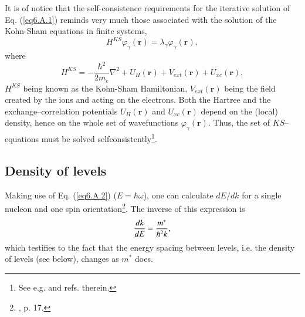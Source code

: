 It is of notice that the self-consistence requirements for the iterative solution of Eq. (\ref{eq6.A.1}) reminds very much those associated with the solution of the Kohn-Sham equations in finite systems,
 \begin{equation}
 H^{KS}\varphi_\gamma(\mathbf{r})=\lambda_\gamma\varphi_\gamma(\mathbf{r}),
 \end{equation}
where
 \begin{equation}
 H^{KS}=-\frac{\hbar^2}{2 m_e}\nabla^2+U_H(\mathbf{r})+V_{ext}(\mathbf{r})+U_{xc}(\mathbf{r}),
 \end{equation}
$H^{KS}$ being known as the Kohn-Sham Hamiltonian, $V_{ext}(\mathbf{r})$ being the field created by the ions and acting on the electrons. Both the Hartree and the exchange--correlation potentials $U_H(\mathbf{r})$ and $U_{xc}(\mathbf{r})$ depend on the (local) density, hence on the whole set of wavefunctions $\varphi_\gamma(\mathbf{r})$. Thus, the set of $KS$--equations must be solved selfconsistently\footnote{See e.g. \cite{Broglia:04b} and refs. therein.}.
\subsection{Density of levels}\label{C4AppA1}
Making use of Eq. (\ref{eq6.A.2})  ($E=\hbar\omega$), one can calculate $dE/dk$ for a single nucleon and one spin orientation\footnote{\cite{Mahaux:85}, p. 17.}. The inverse of this expression is
\begin{align}
\frac{dk}{dE}=\frac{m^*}{\hbar^2k},\idx{Density of levels}
\end{align} 
which testifies to the fact that the energy spacing between levels, i.e. the density of levels (see below), changes as $m^*$ does.

